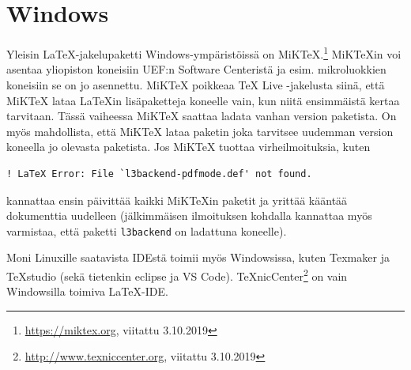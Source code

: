 \section{Windows}
\label{sec:latex:windows}

Yleisin \LaTeX-jakelupaketti Windows-ympäristöissä on MiKTeX.\footnote{\url{https://miktex.org}, viitattu 3.10.2019} MiKTeXin voi asentaa yliopiston koneisiin UEF:n Software Centeristä ja esim. mikroluokkien koneisiin se on jo asennettu. MiKTeX poikkeaa TeX Live -jakelusta siinä, että MiKTeX lataa \LaTeX{in} lisäpaketteja koneelle vain, kun niitä ensimmäistä kertaa tarvitaan. Tässä vaiheessa MiKTeX saattaa ladata vanhan version paketista. On myös mahdollista, että MiKTeX lataa paketin joka tarvitsee uudemman version koneella jo olevasta paketista. Jos MiKTeX tuottaa virheilmoituksia, kuten
\begin{lstlisting}[style=cmdline]
! LaTeX Error: File `l3backend-pdfmode.def' not found.
\end{lstlisting}
kannattaa ensin päivittää kaikki MiKTeXin paketit ja yrittää kääntää dokumenttia uudelleen (jälkimmäisen ilmoituksen kohdalla kannattaa myös varmistaa, että paketti \texttt{l3backend} on ladattuna koneelle).

Moni Linuxille saatavista IDEstä toimii myös Windowsissa, kuten Texmaker ja TeXstudio (sekä tietenkin eclipse ja VS Code). TeXnicCenter\footnote{\url{http://www.texniccenter.org}, viitattu 3.10.2019} on vain Windowsilla toimiva \LaTeX-IDE. 



